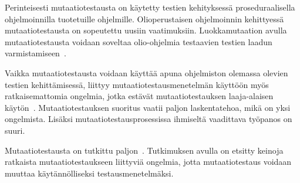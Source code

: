 \documentclass[finnish, grading]{tktltiki2}
\theoremstyle{definition}
\theoremstyle{remark}
\begin{document}
Perinteisesti mutaatiotestausta on käytetty testien kehityksessä proseduraalisella ohjelmoinnilla tuotetuille ohjelmille. Olioperustaisen ohjelmoinnin kehittyessä mutaatiotestausta on sopeutettu uusiin vaatimuksiin. Luokkamutaation avulla mutaatiotestausta voidaan soveltaa olio-ohjelmia testaavien testien laadun varmistamiseen~\cite{Kim:Clark:McDermid:2000}.

Vaikka mutaatiotestausta voidaan käyttää apuna ohjelmiston olemassa olevien testien kehittämisessä, liittyy mutaatiotestausmenetelmän käyttöön myös ratkaisemattomia ongelmia, jotka estävät mutaatiotestauksen laaja-alaisen käytön~\cite[s. 652]{Jia:Harman:2011}. Mutaatiotestauksen suoritus vaatii paljon laskentatehoa, mikä on yksi ongelmista. Lisäksi mutaatiotestausprosessissa ihmiseltä vaadittava työpanos on suuri. 

Mutaatiotestausta on tutkittu paljon~\cite[s. 649]{Jia:Harman:2011}. Tutkimuksen avulla on etsitty keinoja ratkaista mutaatiotestaukseen liittyviä ongelmia, jotta mutaatiotestaus voidaan muuttaa käytännölliseksi testausmenetelmäksi. 

%
%
%
\end{document}
